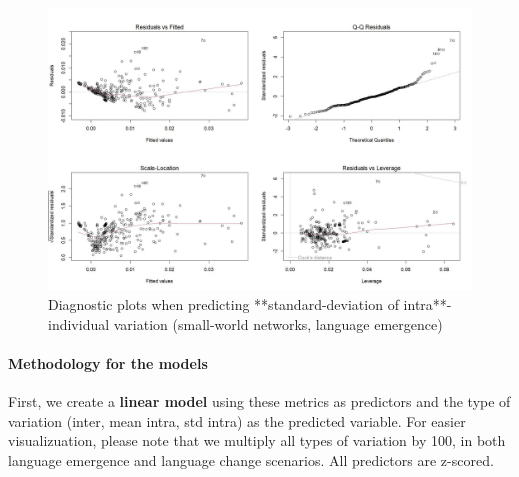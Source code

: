\documentclass[
]{article}
\begin{document}
\begin{figure}[!H]

{\centering \includegraphics{./Figures/unnamed-chunk-136-1} 

}

\caption{Diagnostic plots when predicting **standard-deviation of intra**-individual variation (small-world networks, language emergence)}\label{fig:unnamed-chunk-136}
\end{figure}

\hypertarget{methodology-for-the-models}{%
\paragraph{Methodology for the
models}\label{methodology-for-the-models}}

First, we create a \textbf{linear model} using these metrics as
predictors and the type of variation (inter, mean intra, std intra) as
the predicted variable. For easier visualizuation, please note that we
multiply all types of variation by 100, in both language emergence and
language change scenarios. All predictors are z-scored.
\end{document}
